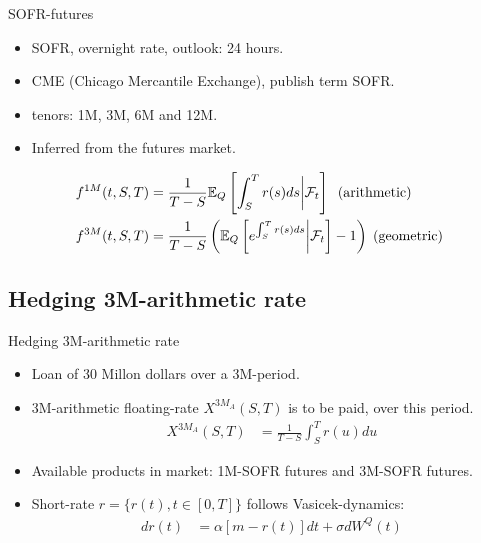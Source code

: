 \documentclass[UKenglish]{beamer}
\newcommand{\E}{\mathbb{E}}  %
\newcommand{\F}{\mathcal{F}} %
\begin{document}
\begin{frame}{SOFR-futures}
\begin{itemize}
    \item SOFR, overnight rate, outlook: 24 hours. 
    \item CME (Chicago Mercantile Exchange), publish term SOFR. 
    \item tenors: 1M, 3M, 6M and 12M. 
    \item Inferred from the futures market. 
\end{itemize}


\begin{definition}
\begin{align*}
f^{1M}(t,S,T) &= \frac{1}{T-S}\E_{Q}\left[
\int_{S}^{T}r(s)ds\bigg{|}\F_{t}
\right]\;\;(\text{arithmetic}) \\ 
f^{3M}(t,S,T) &= \frac{1}{T-S}\left(
\E_{Q}\left[
e^{\int_{S}^{T}r(s)ds}\bigg{|}\F_{t}
\right] - 1
\right)\;(\text{geometric})
\end{align*}    
\end{definition}
\end{frame}

\subsection{Hedging 3M-arithmetic rate}

\begin{frame}{Hedging 3M-arithmetic rate}
\begin{itemize}
    \item Loan of 30 Millon dollars over a 3M-period. 
    \item 3M-arithmetic floating-rate $X^{3M_{A}}(S,T)$ is to be paid, over this period. 
    \begin{align*}
    X^{3M_{A}}(S,T) &= \frac{1}{T-S}\int_{S}^{T}r(u)du
    \end{align*}
    \item Available products in market: 1M-SOFR futures and 3M-SOFR futures. 
    \item Short-rate $r = \{r(t), t\in [0,T]\}$ follows Vasicek-dynamics: 
    \begin{align*}
     dr(t) &= \alpha[m-r(t)]dt + \sigma dW^{Q}(t)   
    \end{align*}
\end{itemize}
\end{frame} 
\end{document}
